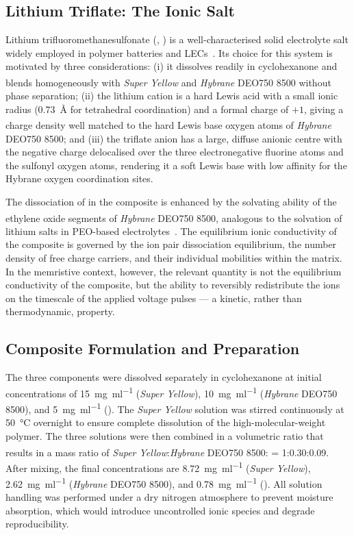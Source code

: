 \documentclass[12pt, a4paper, twoside]{report}
\newcommand{\SY}{\textit{Super Yellow}}
\newcommand{\Hybrane}{\textit{Hybrane}\textsuperscript{\textregistered} DEO750 8500}
\newcommand{\LiTf}{\ce{LiCF3SO3}}
\begin{document}
\subsection{Lithium Triflate: The Ionic Salt}\label{subsec:litf}

Lithium trifluoromethanesulfonate (\LiTf{}, ) is a well-characterised solid electrolyte salt widely employed in polymer batteries and LECs~\cite{Pei1995, Edman2008}. Its choice for this system is motivated by three considerations: (i) it dissolves readily in cyclohexanone and blends homogeneously with \SY{} and \Hybrane{} without phase separation; (ii) the lithium cation is a hard Lewis acid with a small ionic radius (\SI{0.73}{\angstrom} for tetrahedral coordination) and a formal charge of $+1$, giving a charge density well matched to the hard Lewis base oxygen atoms of \Hybrane{}; and (iii) the triflate anion has a large, diffuse anionic centre with the negative charge delocalised over the three electronegative fluorine atoms and the sulfonyl oxygen atoms, rendering it a soft Lewis base with low affinity for the Hybrane oxygen coordination sites.

The dissociation of \LiTf{} in the composite is enhanced by the solvating ability of the ethylene oxide segments of \Hybrane{}, analogous to the solvation of lithium salts in PEO-based electrolytes~\cite{Armand1989}. The equilibrium ionic conductivity of the composite is governed by the ion pair dissociation equilibrium, the number density of free charge carriers, and their individual mobilities within the matrix. In the memristive context, however, the relevant quantity is not the equilibrium conductivity of the composite, but the ability to reversibly redistribute the ions on the timescale of the applied voltage pulses — a kinetic, rather than thermodynamic, property.

\subsection{Composite Formulation and Preparation}\label{subsec:formulation}

The three components were dissolved separately in cyclohexanone at initial concentrations of \SI{15}{\milli\gram\per\milli\litre} (\SY{}), \SI{10}{\milli\gram\per\milli\litre} (\Hybrane{}), and \SI{5}{\milli\gram\per\milli\litre} (\LiTf{}). The \SY{} solution was stirred continuously at \SI{50}{\celsius} overnight to ensure complete dissolution of the high-molecular-weight polymer. The three solutions were then combined in a volumetric ratio that results in a mass ratio of \SY{}:\Hybrane{}:\LiTf{} = 1:0.30:0.09. After mixing, the final concentrations are \SI{8.72}{\milli\gram\per\milli\litre} (\SY{}), \SI{2.62}{\milli\gram\per\milli\litre} (\Hybrane{}), and \SI{0.78}{\milli\gram\per\milli\litre} (\LiTf{}). All solution handling was performed under a dry nitrogen atmosphere to prevent moisture absorption, which would introduce uncontrolled ionic species and degrade reproducibility.
\end{document}
